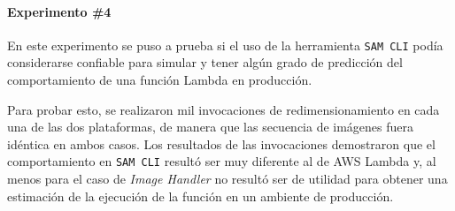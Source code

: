 \paragraph{Experimento \#4} En este experimento se puso a prueba si el uso de la herramienta \texttt{SAM CLI} podía considerarse confiable para simular y tener algún grado de predicción del comportamiento de una función Lambda en producción. 

Para probar esto, se realizaron mil invocaciones de redimensionamiento en cada una de las dos plataformas, de manera que las secuencia de imágenes fuera idéntica en ambos casos. Los resultados de las invocaciones demostraron que el comportamiento en \texttt{SAM CLI} resultó ser muy diferente al de AWS Lambda y, al menos para el caso de \emph{Image Handler} no resultó ser de utilidad para obtener una estimación de la ejecución de la función en un ambiente de producción.








